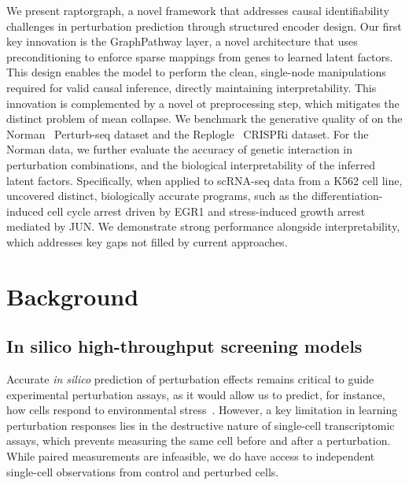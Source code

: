 \documentclass[10pt,letterpaper]{article}
\theoremstyle{definition}
\theoremstyle{remark}
\newcommand{\insilico}{\emph{in silico}}
\begin{document}
We present \gls{raptorgraph}, a novel framework that addresses causal identifiability challenges in perturbation prediction through structured encoder design.
Our first key innovation is the GraphPathway layer, a novel architecture that uses preconditioning to enforce sparse mappings from genes to learned latent factors.
This design enables the model to perform the clean, single-node manipulations required for valid causal inference, directly maintaining interpretability.
This innovation is complemented by a novel \gls{ot} preprocessing step, which mitigates the distinct problem of mean collapse.
We benchmark the generative quality of  on the Norman~\cite{norman2019exploring} Perturb-seq dataset and the Replogle~\cite{replogle_combinatorial_2020} CRISPRi dataset.
For the Norman data, we further evaluate the accuracy of genetic interaction in perturbation combinations, and the biological interpretability of the inferred latent factors.
Specifically, when applied to scRNA-seq data from a K562 cell line,  uncovered distinct, biologically accurate programs, such as the differentiation-induced cell cycle arrest driven by EGR1 and stress-induced growth arrest mediated by JUN.
We demonstrate strong performance alongside interpretability, which addresses key gaps not filled by current approaches.




\section*{Background}

\subsection*{In silico high-throughput screening models}
Accurate \insilico{} prediction of perturbation effects remains critical to guide experimental perturbation assays, as it would allow us to predict, for instance, how cells respond to environmental stress~\cite{frangieh2021multimodal}.
However, a key limitation in learning perturbation responses lies in the destructive nature of single-cell transcriptomic assays, which prevents measuring the same cell before and after a perturbation. While paired measurements are infeasible, we do have access to independent single-cell observations from control and perturbed cells.
\end{document}

